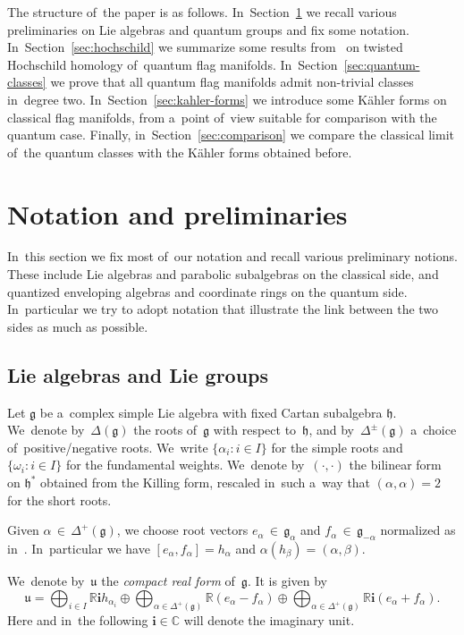 \documentclass[pdftex]{sigma}
\numberwithin{equation}{section}
\newcommand{\lieg}{\mathfrak{g}}
\newcommand{\lieh}{\mathfrak{h}}
\newcommand{\lieu}{\mathfrak{u}}
\newcommand{\bbC}{\mathbb{C}}
\newcommand{\bbR}{\mathbb{R}}
\newcommand{\iu}{\boldsymbol{i}}
\begin{document}
The structure of~the paper is as follows.
In~Section~\ref{sec:notations} we recall various preliminaries on Lie algebras and quantum groups and fix some notation.
In~Section~\ref{sec:hochschild} we summarize some results from~\cite{twist-hoch} on twisted Hoch\-schild homology of~quantum flag manifolds.
In~Section~\ref{sec:quantum-classes} we prove that all quantum flag manifolds admit non-trivial classes in~degree two.
In~Section~\ref{sec:kahler-forms} we introduce some K\"ahler forms on classical flag manifolds, from a~point of~view suitable for comparison with the quantum case.
Finally, in~Section~\ref{sec:comparison} we compare the classical limit of~the quantum classes with the K\"ahler forms obtained before.

\section{Notation and preliminaries}
\label{sec:notations}

In~this section we fix most of~our notation and recall various preliminary notions.
These include Lie algebras and parabolic subalgebras on the classical side, and quantized enveloping algebras and coordinate rings on the quantum side.
In~particular we try to adopt notation that illustrate the link between the two sides as much as possible.

\subsection{Lie algebras and Lie groups}

Let $\lieg$ be a~complex simple Lie algebra with fixed Cartan subalgebra $\lieh$.
We~denote by~$\Delta(\lieg)$ the roots of~$\lieg$ with respect to~$\lieh$, and by~$\Delta^\pm(\lieg)$ a~choice of~positive/negative roots.
We~write $\{\alpha_i\colon i \in I\}$ for the simple roots and $\{\omega_i\colon i \in I\}$ for the fundamental weights.
We~denote by~$(\cdot, \cdot)$ the bilinear form on $\lieh^*$ obtained from the Killing form, rescaled in~such a~way that $(\alpha, \alpha) = 2$ for the short roots.

Given $\alpha \,{\in}\, \Delta^+(\lieg)$, we choose root vectors $e_\alpha \,{\in}\, \lieg_\alpha$ and $f_\alpha \,{\in}\, \lieg_{-\alpha}$ normalized as in~\cite[The\-o\-rem~6.6]{knapp}.
In~particular we have $[e_\alpha, f_\alpha] = h_\alpha$ and $\alpha(h_\beta) = (\alpha, \beta)$.

We~denote by~$\lieu$ the \emph{compact real form} of~$\lieg$. It is given by
\[
\lieu = \bigoplus_{i \in I} \bbR \iu h_{\alpha_i} \oplus \bigoplus_{\alpha \in \Delta^+(\lieg)} \bbR (e_\alpha - f_\alpha) \oplus \bigoplus_{\alpha \in \Delta^+(\lieg)} \bbR \iu (e_\alpha + f_\alpha).
\]
Here and in~the following $\iu \in \bbC$ will denote the imaginary unit.
\end{document}

